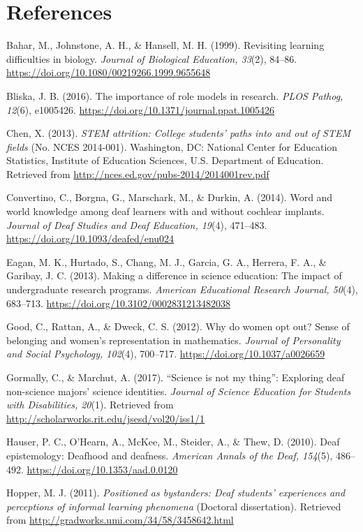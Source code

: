 \documentclass[11.5pt]{sig-alternate} %
\begin{document}
 
\section*{ References}\par 

\leftskip 0.25in
\parindent -0.25in 
Bahar, M., Johnstone, A. H., \& Hansell, M. H. (1999). Revisiting learning difficulties in biology. \textit{Journal of Biological Education, 33}(2), 84–86. \url{https://doi.org/10.1080/00219266.1999.9655648}

Bliska, J. B. (2016). The importance of role models in research. \textit{PLOS Pathog, 12}(6), e1005426. \url{https://doi.org/10.1371/journal.ppat.1005426}

Chen, X. (2013). \textit{STEM attrition: College students’ paths into and out of STEM fields} (No. NCES 2014-001). Washington, DC: National Center for Education Statistics, Institute of Education Sciences, U.S. Department of Education. Retrieved from \url{http://nces.ed.gov/pubs-2014/2014001rev.pdf}

Convertino, C., Borgna, G., Marschark, M., \& Durkin, A. (2014). Word and world knowledge among deaf learners with and without cochlear implants. \textit{Journal of Deaf Studies and Deaf Education, 19}(4), 471–483. \url{https://doi.org/10.1093/deafed/enu024}

Eagan, M. K., Hurtado, S., Chang, M. J., Garcia, G. A., Herrera, F. A., \& Garibay, J. C. (2013). Making a difference in science education: The impact of undergraduate research programs. \textit{American Educational Research Journal, 50}(4), 683–713. \url{https://doi.org/10.3102/0002831213482038}

Good, C., Rattan, A., \& Dweck, C. S. (2012). Why do women opt out? Sense of belonging and women’s representation in mathematics. \textit{Journal of Personality and Social Psychology, 102}(4), 700–717. \url{https://doi.org/10.1037/a0026659}

Gormally, C., \& Marchut, A. (2017). “Science is not my thing”: Exploring deaf non-science majors’ science identities. \textit{Journal of Science Education for Students with Disabilities, 20}(1). Retrieved from \url{http://scholarworks.rit.edu/jsesd/vol20/iss1/1}

Hauser, P. C., O’Hearn, A., McKee, M., Steider, A., \& Thew, D. (2010). Deaf epistemology: Deafhood and deafness. \textit{American Annals of the Deaf, 154}(5), 486–492. \url{https://doi.org/10.1353/aad.0.0120}

Hopper, M. J. (2011). \textit{Positioned as bystanders: Deaf students’ experiences and perceptions of informal learning phenomena} (Doctoral dissertation). Retrieved from \url{http://gradworks.umi.com/34/58/3458642.html}
\end{document}
